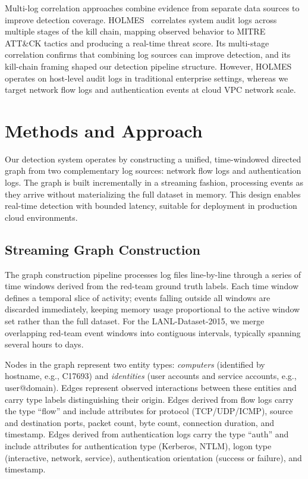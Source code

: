 \documentclass[letterpaper,twocolumn,10pt]{article}
\begin{document}
Multi-log correlation approaches combine evidence from separate data sources to improve detection coverage. HOLMES~\cite{holmes2019} correlates system audit logs across multiple stages of the kill chain, mapping observed behavior to MITRE ATT\&CK tactics and producing a real-time threat score. Its multi-stage correlation confirms that combining log sources can improve detection, and its kill-chain framing shaped our detection pipeline structure. However, HOLMES operates on host-level audit logs in traditional enterprise settings, whereas we target network flow logs and authentication events at cloud VPC network scale.

\section{Methods and Approach}

Our detection system operates by constructing a unified, time-windowed directed graph from two complementary log sources: network flow logs and authentication logs. The graph is built incrementally in a streaming fashion, processing events as they arrive without materializing the full dataset in memory. This design enables real-time detection with bounded latency, suitable for deployment in production cloud environments.

\subsection{Streaming Graph Construction}

The graph construction pipeline processes log files line-by-line through a series of time windows derived from the red-team ground truth labels. Each time window defines a temporal slice of activity; events falling outside all windows are discarded immediately, keeping memory usage proportional to the active window set rather than the full dataset. For the LANL-Dataset-2015, we merge overlapping red-team event windows into contiguous intervals, typically spanning several hours to days.

Nodes in the graph represent two entity types: \textit{computers} (identified by hostname, e.g., C17693) and \textit{identities} (user accounts and service accounts, e.g., user@domain). Edges represent observed interactions between these entities and carry type labels distinguishing their origin. Edges derived from flow logs carry the type ``flow'' and include attributes for protocol (TCP/UDP/ICMP), source and destination ports, packet count, byte count, connection duration, and timestamp. Edges derived from authentication logs carry the type ``auth'' and include attributes for authentication type (Kerberos, NTLM), logon type (interactive, network, service), authentication orientation (success or failure), and timestamp.
\end{document}
